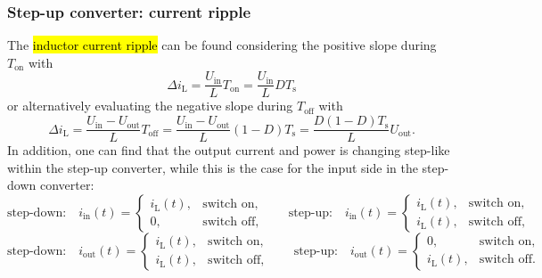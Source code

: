\begin{frame}
    \frametitle{Step-up converter: current ripple}
    The \hl{inductor current ripple} can be found considering the positive slope during $T_\mathrm{on}$ with
    \begin{equation}
        \Delta i_\mathrm{L} = \frac{U_\mathrm{in}}{L}T_\mathrm{on} = \frac{U_\mathrm{in}}{L}DT_\mathrm{s}
    \end{equation}
    or alternatively evaluating the negative slope during $T_\mathrm{off}$ with
    \begin{equation}
        \Delta i_\mathrm{L} = \frac{U_\mathrm{in}-U_\mathrm{out}}{L}T_\mathrm{off} = \frac{U_\mathrm{in}-U_\mathrm{out}}{L}(1-D)T_\mathrm{s}=\frac{D(1-D)T_\mathrm{s}}{L}U_\mathrm{out}.
    \end{equation}
    In addition, one can find that the output current and power is changing step-like within the step-up converter, while this is the case for the input side in the step-down converter: 
    \begin{equation*}
        \mbox{step-down:} \quad i_\mathrm{in}(t) = \begin{cases}
            i_\mathrm{L}(t), & \mbox{switch on},\\
            0, & \mbox{switch off},
        \end{cases}
        \qquad
        \mbox{step-up:} \quad i_\mathrm{in}(t) = \begin{cases}
            i_\mathrm{L}(t), & \mbox{switch on},\\
            i_\mathrm{L}(t), & \mbox{switch off},
        \end{cases}
    \end{equation*}
    \begin{equation*}
        \mbox{step-down:} \quad i_\mathrm{out}(t) = \begin{cases}
            i_\mathrm{L}(t), & \mbox{switch on},\\
            i_\mathrm{L}(t), & \mbox{switch off},
        \end{cases}
        \qquad
        \mbox{step-up:} \quad i_\mathrm{out}(t) = \begin{cases}
            0, & \mbox{switch on},\\
            i_\mathrm{L}(t), & \mbox{switch off}.
        \end{cases}
    \end{equation*}
\end{frame}

